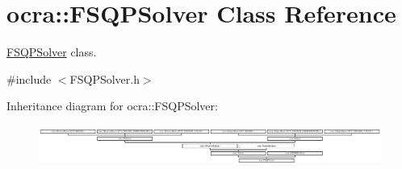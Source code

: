 \hypertarget{classocra_1_1FSQPSolver}{}\section{ocra\+:\+:F\+S\+Q\+P\+Solver Class Reference}
\label{classocra_1_1FSQPSolver}


\hyperlink{classocra_1_1FSQPSolver}{F\+S\+Q\+P\+Solver} class.  




{\ttfamily \#include $<$F\+S\+Q\+P\+Solver.\+h$>$}

Inheritance diagram for ocra\+:\+:F\+S\+Q\+P\+Solver\+:\begin{figure}[H]
\begin{center}
\leavevmode
\includegraphics[height=1.352657cm]{dc/d6e/classocra_1_1FSQPSolver}
\end{center}
\end{figure}
